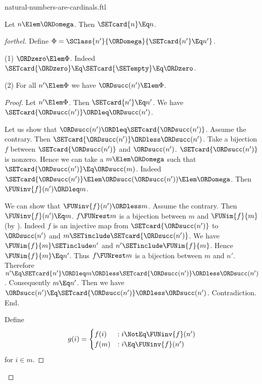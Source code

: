 \documentclass{stex}
\begin{document}
\begin{smodule}{natural-numbers-are-cardinals.ftl}

\begin{theorem}[forthel]
  Let $n \Elem \ORDomega$.
  Then $\SETcard{n} \Eq n$.
\end{theorem}
\begin{proof}[forthel]
  Define $\Phi = \SClass{n'}{\ORDomega}{\SETcard{n'} \Eq n'}$.

  (1) $\ORDzero \Elem \Phi$.
  Indeed $\SETcard{\ORDzero} \Eq \SETcard{\SETempty} \Eq \ORDzero$.

  (2) For all $n' \Elem \Phi$ we have $\ORDsucc(n') \Elem \Phi$.
  \begin{proof}
    Let $n' \Elem \Phi$.
    Then $\SETcard{n'} \Eq n'$.
    We have $\SETcard{\ORDsucc(n')} \ORDleq \ORDsucc(n')$.

    Let us show that $\ORDsucc(n') \ORDleq \SETcard{\ORDsucc(n')}$.
      Assume the contrary.
      Then $\SETcard{\ORDsucc(n')} \ORDless \ORDsucc(n')$.
      Take a bijection $f$ between $\SETcard{\ORDsucc(n')}$ and $\ORDsucc(n')$.
      $\SETcard{\ORDsucc(n')}$ is nonzero.
      Hence we can take a $m \Elem \ORDomega$ such that $\SETcard{\ORDsucc(n')} \Eq \ORDsucc(m)$.
      Indeed $\SETcard{\ORDsucc(n')} \Elem \ORDsucc(\ORDsucc(n')) \Elem \ORDomega$.
      Then $\FUNinv{f}(n') \ORDleq m$.

      We can show that $\FUNinv{f}(n') \ORDless m$.
        Assume the contrary.
        Then $\FUNinv{f}(n') \Eq m$.
        $f \FUNrest m$ is a bijection between $m$ and $\FUNim{f}{m}$ (by ).
        Indeed $f$ is an injective map from $\SETcard{\ORDsucc(n')}$ to $\ORDsucc(n')$ and
        $m \SETinclude \SETcard{\ORDsucc(n')}$.
        We have $\FUNim{f}{m} \SETinclude n'$ and $n' \SETinclude \FUNim{f}{m}$.
        Hence $\FUNim{f}{m} \Eq n'$.
        Thus $f \FUNrest m$ is a bijection between $m$ and $n'$.
        Therefore $n'
          \Eq \SETcard{n'}
          \ORDleq m
          \ORDless \SETcard{\ORDsucc(n')}
          \ORDless \ORDsucc(n')$.
        Consequently $m \Eq n'$.
        Then we have $\ORDsucc(n') \Eq \SETcard{\ORDsucc(n')} \ORDless \ORDsucc(n')$.
        Contradiction.
      End.

      Define \[ g(i) =
        \begin{cases}
          f(i)  & : i \NotEq \FUNinv{f}(n')
          \\
          f(m)  & : i \Eq \FUNinv{f}(n')
        \end{cases} \]
      for $i \in m$.


\end{proof}
\end{proof}
\end{smodule}
\end{document}
